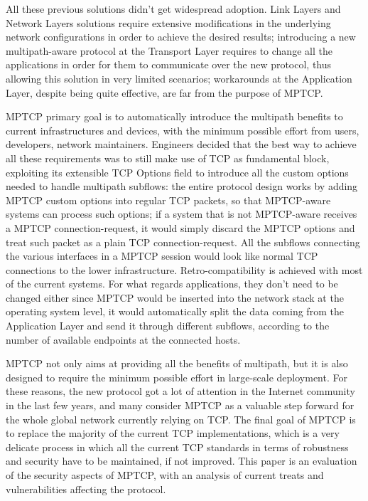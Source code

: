 \vspace{5mm}
All these previous solutions didn't get widespread adoption. Link Layers and Network Layers solutions require extensive modifications in the underlying network configurations in order to achieve the desired results; introducing a new multipath-aware protocol at the Transport Layer requires to change all the applications in order for them to communicate over the new protocol, thus allowing this solution in very limited scenarios; workarounds at the Application Layer, despite being quite effective, are far from the purpose of MPTCP.


MPTCP primary goal is to automatically introduce the multipath benefits to current infrastructures and devices, with the minimum possible effort from users, developers, network maintainers. Engineers decided that the best way to achieve all these requirements was to still make use of TCP as fundamental block, exploiting its extensible TCP Options field to introduce all the custom options needed to handle multipath subflows: the entire protocol design works by adding MPTCP custom options into regular TCP packets, so that MPTCP-aware systems can process such options; if a system that is not MPTCP-aware receives a MPTCP connection-request, it would simply discard the MPTCP options and treat such packet as a plain TCP connection-request. All the subflows connecting the various interfaces in a MPTCP session would look like normal TCP connections to the lower infrastructure. Retro-compatibility is achieved with most of the current systems. For what regards applications, they don't need to be changed either since MPTCP would be inserted into the network stack at the operating system level, it would automatically split the data coming from the Application Layer and send it through different subflows, according to the number of available endpoints at the connected hosts.

\vspace{5mm}
MPTCP not only aims at providing all the benefits of multipath, but it is also designed to require the minimum possible effort in large-scale deployment. For these reasons, the new protocol got a lot of attention in the Internet community in the last few years, and many consider MPTCP as a valuable step forward for the whole global network currently relying on TCP.
The final goal of MPTCP is to replace the majority of the current TCP implementations, which is a very delicate process in which all the current TCP standards in terms of robustness and security have to be maintained, if not improved. This paper is an evaluation of the security aspects of MPTCP, with an analysis of current treats and vulnerabilities affecting the protocol.

